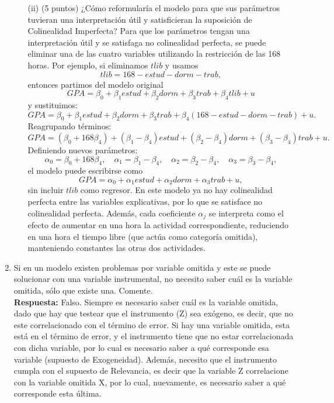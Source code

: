 \documentclass[10pt,a4paper]{article}
\begin{document}
\begin{enumerate}
\begin{enumerate}
    \item[(ii)] (5 puntos) ¿Cómo reformularía el modelo para que sus parámetros tuvieran una interpretación  útil y satisficieran la suposición de Colinealidad Imperfecta?
\color{blue}
Para que los parámetros tengan una interpretación útil y se satisfaga no colinealidad perfecta, se puede eliminar una de las cuatro variables utilizando la restricción de las 168 horas. Por ejemplo, si eliminamos $tlib$ y usamos
    \[
        tlib = 168 - estud - dorm - trab,
    \]
    entonces partimos del modelo original
    \[
        GPA = \beta_0 + \beta_1 estud + \beta_2 dorm + \beta_3 trab + \beta_4 tlib + u
    \]
    y sustituimos:
    \[
        GPA = \beta_0 + \beta_1 estud + \beta_2 dorm + \beta_3 trab + \beta_4 (168 - estud - dorm - trab) + u.
    \]
    Reagrupando términos:
    \[
        GPA = (\beta_0 + 168\beta_4)
        + (\beta_1 - \beta_4) estud
        + (\beta_2 - \beta_4) dorm
        + (\beta_3 - \beta_4) trab
        + u.
    \]
    Definiendo nuevos parámetros:
    \[
        \alpha_0 = \beta_0 + 168\beta_4,\quad
        \alpha_1 = \beta_1 - \beta_4,\quad
        \alpha_2 = \beta_2 - \beta_4,\quad
        \alpha_3 = \beta_3 - \beta_4,
    \]
    el modelo puede escribirse como
    \[
        GPA = \alpha_0 + \alpha_1 estud + \alpha_2 dorm + \alpha_3 trab + u,
    \]
    sin incluir $tlib$ como regresor. En este modelo ya no hay colinealidad perfecta entre las variables explicativas, por lo que se satisface no colinealidad perfecta. Además, cada coeficiente $\alpha_j$ se interpreta como el efecto de aumentar en una hora la actividad correspondiente, reduciendo en una hora el tiempo libre (que actúa como categoría omitida), manteniendo constantes las otras dos actividades.
\color{black}
\end{enumerate}

    
    \item Si en un modelo existen problemas por variable omitida y este se puede solucionar con una variable instrumental, no necesito saber cuál es la variable omitida, sólo que existe una. Comente.\\
    {\color{blue}
    \textbf{Respuesta:} Falso. Siempre es necesario saber cuál es la variable omitida, dado que hay que testear que el instrumento (Z) sea exógeno, es decir, que no este correlacionado con el término de error. Si hay una variable omitida, esta está en el término de error, y el instrumento tiene que no estar correlacionada con dicha variable, por lo cual es necesario saber a qué corresponde esa variable (supuesto de Exogeneidad). Además, necesito que el instrumento cumpla con el supuesto de Relevancia, es decir que la variable Z correlacione con la variable omitida X, por lo cual, nuevamente, es necesario saber a qué corresponde esta última.}
    

\end{enumerate}
\end{document}
